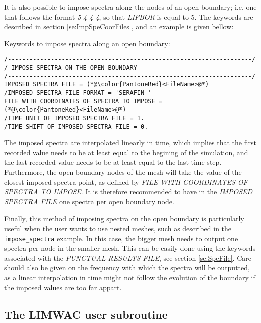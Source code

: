 It is also possible to impose spectra along the nodes of an open boundary; i.e. one that follows the format \textit{5 4 4 4}, so that \textit{LIFBOR} is equal to $5$. The keywords are described in section \ref{se:ImpSpeCoorFiles}, and an example is given bellow:

\begin{CommentBlock}{Keywords to impose spectra along an open boundary:}
\lstset{language=TelemacCas,
        basicstyle=\scriptsize\ttfamily}
\begin{lstlisting}[frame=trBL]
/--------------------------------------------------------------------/
/ IMPOSE SPECTRA ON THE OPEN BOUNDARY
/--------------------------------------------------------------------/
IMPOSED SPECTRA FILE = (*@\color{PantoneRed}<FileName>@*)
/IMPOSED SPECTRA FILE FORMAT = 'SERAFIN '
FILE WITH COORDINATES OF SPECTRA TO IMPOSE =
(*@\color{PantoneRed}<FileName>@*)
/TIME UNIT OF IMPOSED SPECTRA FILE = 1.
/TIME SHIFT OF IMPOSED SPECTRA FILE = 0.
\end{lstlisting}
\end{CommentBlock}

The imposed spectra are interpolated linearly in time, which implies that the first recorded value needs to be at
least equal to the begining of the simulation, and the last recorded value needs to be at least equal to the last
time step. Furthermore, the open boundary nodes of the mesh will take the value of the closest imposed spectra
point, as defined by \textit{FILE WITH COORDINATES OF SPECTRA TO IMPOSE}. It is therefore recommended to have
in the \textit{IMPOSED SPECTRA FILE} one spectra per open boundary node.

Finally, this method of imposing spectra on the open boundary is particularly useful when the user wants to use
nested meshes, such as described in the \texttt{impose\_spectra} example. In this case, the bigger mesh
needs to output one spectra per node in the smaller mesh. This can be easily done using the keywords associated
with the \textit{PUNCTUAL RESULTS FILE}, see section \ref{se:SpeFile}. Care should also be given on the
frequency with which the spectra will be outputted, as a linear interpolation in time might not follow the
evolution of the boundary if the imposed values are too far appart.

\subsection{ The LIMWAC user subroutine}


